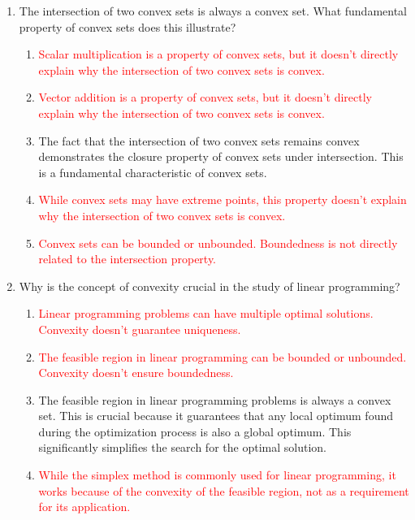 \documentclass{article}%
\newcommand{\incorrect}[1]{\textcolor{red}{#1}}
\begin{document}
\begin{enumerate}
\begin{enumerate}
\item \incorrect{A non-convex set can be connected.  Convexity and connectedness are distinct properties.}%
\item \incorrect{A non-convex set can be bounded or unbounded.  Boundedness is not related to convexity.}%
\end{enumerate}%
\vspace{1em}%
\item The intersection of two convex sets is always a convex set.  What fundamental property of convex sets does this illustrate?%
\begin{enumerate}%
\item \incorrect{Scalar multiplication is a property of convex sets, but it doesn't directly explain why the intersection of two convex sets is convex.}%
\item \incorrect{Vector addition is a property of convex sets, but it doesn't directly explain why the intersection of two convex sets is convex.}%
\item The fact that the intersection of two convex sets remains convex demonstrates the closure property of convex sets under intersection. This is a fundamental characteristic of convex sets.%
\item \incorrect{While convex sets may have extreme points, this property doesn't explain why the intersection of two convex sets is convex.}%
\item \incorrect{Convex sets can be bounded or unbounded.  Boundedness is not directly related to the intersection property.}%
\end{enumerate}%
\vspace{1em}%
\item Why is the concept of convexity crucial in the study of linear programming?%
\begin{enumerate}%
\item \incorrect{Linear programming problems can have multiple optimal solutions.  Convexity doesn't guarantee uniqueness.}%
\item \incorrect{The feasible region in linear programming can be bounded or unbounded.  Convexity doesn't ensure boundedness.}%
\item The feasible region in linear programming problems is always a convex set.  This is crucial because it guarantees that any local optimum found during the optimization process is also a global optimum. This significantly simplifies the search for the optimal solution.%
\item \incorrect{While the simplex method is commonly used for linear programming, it works because of the convexity of the feasible region, not as a requirement for its application.}%

\end{enumerate}
\end{enumerate}
\end{document}
